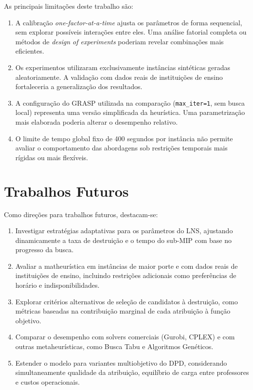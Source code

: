 As principais limitações deste trabalho são:

\begin{enumerate}
  \item A calibração \emph{one-factor-at-a-time} ajusta os parâmetros de forma sequencial, sem explorar possíveis interações entre eles. Uma análise fatorial completa ou métodos de \emph{design of experiments} poderiam revelar combinações mais eficientes.

  \item Os experimentos utilizaram exclusivamente instâncias sintéticas geradas aleatoriamente. A validação com dados reais de instituições de ensino fortaleceria a generalização dos resultados.

  \item A configuração do GRASP utilizada na comparação (\texttt{max\_iter=1}, sem busca local) representa uma versão simplificada da heurística. Uma parametrização mais elaborada poderia alterar o desempenho relativo.

  \item O limite de tempo global fixo de 400 segundos por instância não permite avaliar o comportamento das abordagens sob restrições temporais mais rígidas ou mais flexíveis.
\end{enumerate}

\section{Trabalhos Futuros}

Como direções para trabalhos futuros, destacam-se:

\begin{enumerate}
  \item Investigar estratégias adaptativas para os parâmetros do LNS, ajustando dinamicamente a taxa de destruição e o tempo do sub-MIP com base no progresso da busca.

  \item Avaliar a matheurística em instâncias de maior porte e com dados reais de instituições de ensino, incluindo restrições adicionais como preferências de horário e indisponibilidades.

  \item Explorar critérios alternativos de seleção de candidatos à destruição, como métricas baseadas na contribuição marginal de cada atribuição à função objetivo.

  \item Comparar o desempenho com solvers comerciais (Gurobi, CPLEX) e com outras metaheurísticas, como Busca Tabu e Algoritmos Genéticos.

  \item Estender o modelo para variantes multiobjetivo do DPD, considerando simultaneamente qualidade da atribuição, equilíbrio de carga entre professores e custos operacionais.
\end{enumerate}

